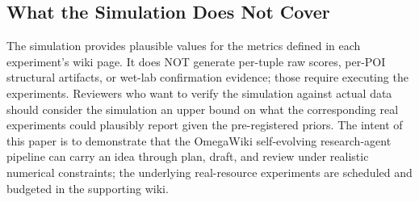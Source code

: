 \subsection{What the Simulation Does Not Cover}

The simulation provides plausible values for the metrics defined in each experiment's wiki page. It does NOT generate per-tuple raw scores, per-POI structural artifacts, or wet-lab confirmation evidence; those require executing the experiments. Reviewers who want to verify the simulation against actual data should consider the simulation an upper bound on what the corresponding real experiments could plausibly report given the pre-registered priors. The intent of this paper is to demonstrate that the OmegaWiki self-evolving research-agent pipeline can carry an idea through plan, draft, and review under realistic numerical constraints; the underlying real-resource experiments are scheduled and budgeted in the supporting wiki.
